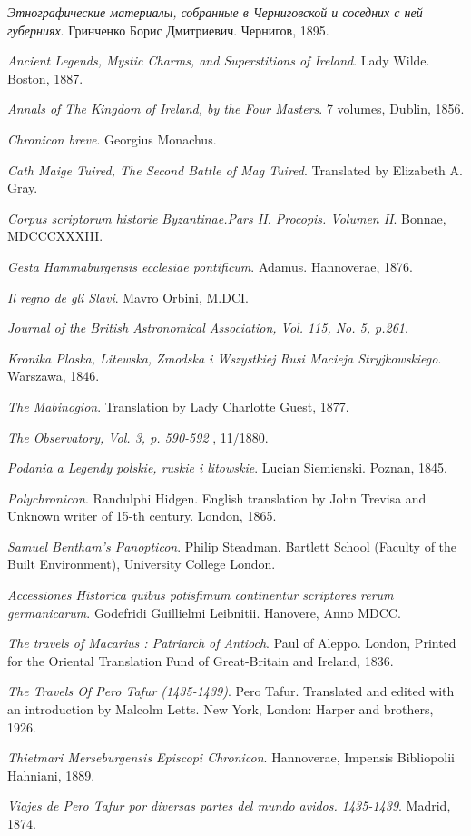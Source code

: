\emph{Этнографические материалы, собранные в Черниговской и соседних с ней губерниях}. Гринченко Борис Дмитриевич. Чернигов, 1895.

\emph{Ancient Legends, Mystic Charms, and Superstitions of Ireland}. Lady Wilde. Boston, 1887.

\emph{Annals of The Kingdom of Ireland, by the Four Masters}. 7 volumes, Dublin, 1856.

\emph{Chronicon breve}. Georgius Monachus. 

\emph{Cath Maige Tuired, The Second Battle of Mag Tuired}. Translated by Elizabeth A. Gray.

\emph{Corpus scriptorum historie Byzantinae.Pars II. Procopis. Volumen II}. Bonnae, MDCCCXXXIII.

\emph{Gesta Hammaburgensis ecclesiae pontificum}. Adamus. Hannoverae, 1876. 

\emph{Il regno de gli Slavi}. Mavro Orbini, M.DCI.

\emph{Journal of the British Astronomical Association, Vol. 115, No. 5, p.261}.

\emph{Kronika Ploska, Litewska, Zmodska i Wszystkiej Rusi Macieja Stryjkowskiego}. Warszawa, 1846.


\emph{The Mabinogion}. Translation by Lady Charlotte Guest, 1877.

\emph{The Observatory, Vol. 3, p. 590-592 }, 11/1880.

\emph{Podania a Legendy polskie, ruskie i litowskie}. Lucian Siemienski. Poznan, 1845.

\emph{Polychronicon}. Randulphi Hidgen. English translation by John Trevisa and Unknown writer of 15-th century. London, 1865.

\emph{Samuel Bentham's Panopticon}. Philip Steadman. Bartlett School (Faculty of the Built Environment), University College London.

\emph{Accessiones Historica quibus potisfimum continentur scriptores rerum germanicarum}. Godefridi Guillielmi Leibnitii. Hanovere, Anno MDCC.

\emph{The travels of Macarius : Patriarch of Antioch}. Paul of Aleppo. London, Printed for the Oriental Translation Fund of Great-Britain and Ireland, 1836.

\emph{The Travels Of Pero Tafur (1435-1439)}. Pero Tafur. Translated and edited with an introduction by Malcolm Letts. New York, London: Harper and brothers, 1926.

\emph{Thietmari Merseburgensis
Episcopi Chronicon}. Hannoverae, Impensis Bibliopolii Hahniani, 1889.

\emph{Viajes de Pero Tafur por diversas partes del mundo avidos. 1435-1439}. Madrid, 1874.
